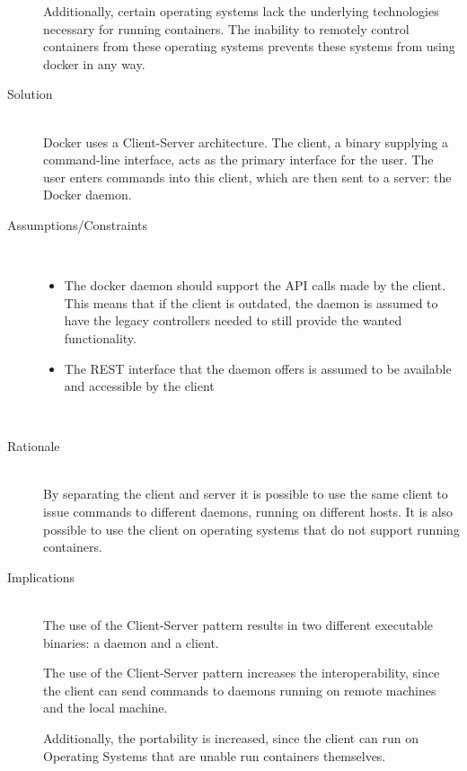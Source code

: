 \begin{description}
Additionally, certain operating systems lack the underlying technologies necessary for running containers. The inability to remotely control containers from these operating systems prevents these systems from using docker in any way.

\item [Solution]~\\
Docker uses a {Client-Server} architecture. The client, a binary supplying a command-line interface, acts as the primary interface for the user. The user enters commands into this client, which are then sent to a server: the Docker daemon.


\item [Assumptions/Constraints]~
\begin{itemize}
\item The docker daemon should support the API calls made by the client. This means that if the client is outdated, the daemon is assumed to have the legacy controllers needed to still provide the wanted functionality.


\item The REST interface that the daemon offers is assumed to be available and accessible by the client
\end{itemize}
~\\[-1.7cm]

\item [Rationale] ~\\

By separating the client and server it is possible to use the same client to issue commands to different daemons, running on different hosts.
It is also possible to use the client on operating systems that do not support running containers.

\item [Implications]~\\
The use of the {Client-Server} pattern results in two different executable binaries: a daemon and a client. 

The use of the {Client-Server} pattern increases the interoperability, since the client can send commands to daemons running on remote machines and the local machine.

Additionally, the portability is increased, since the client can run on Operating Systems that are unable run containers themselves.


\end{description}
